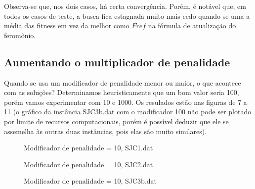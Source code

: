 \documentclass[11pt]{article}
\begin{document}
Observa-se que, nos dois casos, há certa convergência. Porém, é notável que, em todos os casos de teste, a busca fica estagnada muito mais cedo quando se uma a média das fitness em vez da melhor como $F{ref}$ na fórmula de atualização do feromônio.

\subsection{Aumentando o multiplicador de penalidade}

Quando se usa um modificador de penalidade menor ou maior, o que acontece com as soluções? Determinamos heuristicamente que um bom valor seria 100, porém vamos experimentar com 10 e 1000. Os resulados estão nas figuras de 7 a 11 (o gráfico da instância SJC3b.dat com o modificador 100 não pode ser plotado por limite de recursos computacionais, porém é possível deduzir que ele se assemelha às outras duas instâncias, pois elas são muito similares).

\begin{figure}[!ht]
	\centering
    \caption{Modificador de penalidade = 10, SJC1.dat}
    \label{fig:data}
\end{figure}

\begin{figure}[!ht]
	\centering
    \caption{Modificador de penalidade = 10, SJC2.dat}
    \label{fig:data}
\end{figure}

\begin{figure}[!ht]
	\centering
    \caption{Modificador de penalidade = 10, SJC3b.dat}
    \label{fig:data}
\end{figure}
\end{document}

